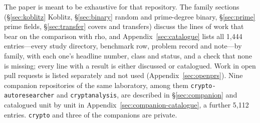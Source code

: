 The paper is meant to be exhaustive for that repository. The family
sections (\S\ref{sec:koblitz} Koblitz, \S\ref{sec:binary} random and
prime-degree binary, \S\ref{sec:prime} prime fields, \S\ref{sec:transfer}
covers and transfers) discuss the lines of work that bear on the comparison
with rho, and Appendix~\ref{sec:catalogue} lists all 1{,}444 entries---every study
directory, benchmark row, problem record and note---by family, with each
one's headline number, class and status, and a check that none is missing;
every line with a result is either discussed or catalogued.
Work in open pull requests is listed separately and not used
(Appendix~\ref{sec:openprs}). Nine companion repositories of the same
laboratory, among them \texttt{crypto-autoresearcher} and
\texttt{cryptanalysis}, are described in \S\ref{sec:companion} and
catalogued unit by unit in Appendix~\ref{sec:companion-catalogue}, a further
5{,}112 entries. \texttt{crypto} and three of the companions are private.

